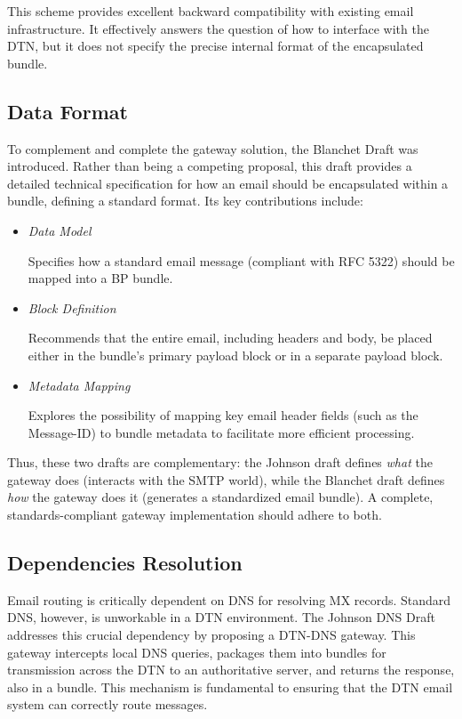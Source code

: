 This scheme provides excellent backward compatibility with existing email infrastructure. It effectively answers the question of how to interface with the DTN, but it does not specify the precise internal format of the encapsulated bundle.

\subsection{Data Format}

To complement and complete the gateway solution, the Blanchet Draft \cite{draft-blanchet-dtn-email-over-bp} was introduced. Rather than being a competing proposal, this draft provides a detailed technical specification for how an email should be encapsulated within a bundle, defining a standard format. Its key contributions include:

\begin{itemize}
    \item \textit{Data Model}
    
    Specifies how a standard email message (compliant with RFC 5322) should be mapped into a BP bundle.
    \item \textit{Block Definition}
    
    Recommends that the entire email, including headers and body, be placed either in the bundle's primary payload block or in a separate payload block.
    \item \textit{Metadata Mapping}
    
    Explores the possibility of mapping key email header fields (such as the Message-ID) to bundle metadata to facilitate more efficient processing.
\end{itemize}

Thus, these two drafts are complementary: the Johnson draft defines \textit{what} the gateway does (interacts with the SMTP world), while the Blanchet draft defines \textit{how} the gateway does it (generates a standardized email bundle). A complete, standards-compliant gateway implementation should adhere to both.

\subsection{Dependencies Resolution}

Email routing is critically dependent on DNS for resolving MX records. Standard DNS, however, is unworkable in a DTN environment. The Johnson DNS Draft \cite{draft-johnson-dtn-interplanetary-dns} addresses this crucial dependency by proposing a DTN-DNS gateway. This gateway intercepts local DNS queries, packages them into bundles for transmission across the DTN to an authoritative server, and returns the response, also in a bundle. This mechanism is fundamental to ensuring that the DTN email system can correctly route messages.

